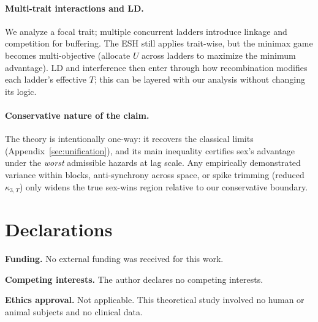 \documentclass[11pt]{article}
\theoremstyle{upright}
\newcommand{\horizon}{\Lambda}
\begin{document}
\paragraph{Multi-trait interactions and LD.}
We analyze a focal trait; multiple concurrent ladders introduce linkage and competition for buffering. The ESH still applies trait-wise, but the minimax game becomes multi-objective (allocate $U$ across ladders to maximize the minimum advantage). LD and interference then enter through how recombination modifies each ladder’s effective $T$; this can be layered with our analysis without changing its logic.

\paragraph{Conservative nature of the claim.}
The theory is intentionally one-way: it recovers the classical limits (Appendix~\ref{sec:unification}), and its main inequality certifies sex’s advantage under the \emph{worst} admissible hazards at lag scale. Any empirically demonstrated variance within blocks, anti-synchrony across space, or spike trimming (reduced $\kappa_{3,T}$) only widens the true sex-wins region relative to our conservative boundary.




\section*{Declarations}

\noindent\textbf{Funding.}
No external funding was received for this work.

\medskip
\noindent\textbf{Competing interests.}
The author declares no competing interests.

\medskip
\noindent\textbf{Ethics approval.}
Not applicable. This theoretical study involved no human or animal subjects and no clinical data.
\end{document}
